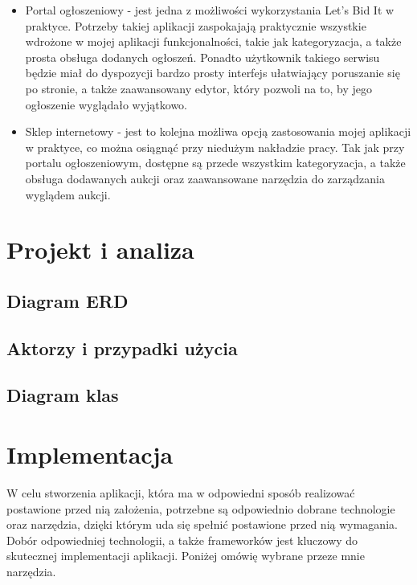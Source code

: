 \documentclass[brudnopis]{xmgr}
\begin{document}
\begin{itemize}

\item Portal ogłoszeniowy - jest jedna z możliwości wykorzystania Let's Bid It w praktyce. Potrzeby takiej aplikacji zaspokajają praktycznie wszystkie wdrożone w mojej aplikacji funkcjonalności, takie jak kategoryzacja, a także prosta obsługa dodanych ogłoszeń. Ponadto użytkownik takiego  serwisu będzie miał do dyspozycji bardzo prosty interfejs ułatwiający poruszanie się po stronie, a także zaawansowany edytor, który pozwoli na to, by jego ogłoszenie wyglądało wyjątkowo.

\item Sklep internetowy - jest to kolejna możliwa opcją zastosowania mojej aplikacji w praktyce, co można osiągnąć przy niedużym nakładzie pracy. Tak jak przy portalu ogłoszeniowym, dostępne są przede wszystkim kategoryzacja, a także obsługa dodawanych aukcji oraz zaawansowane narzędzia do zarządzania wyglądem aukcji.

\end{itemize}

\chapter{Projekt i analiza}

\section{Diagram ERD}

\section{Aktorzy i przypadki użycia}

\section{Diagram klas}

\chapter{Implementacja}
W celu stworzenia aplikacji, która ma w odpowiedni sposób realizować postawione przed nią
założenia, potrzebne są odpowiednio dobrane technologie oraz narzędzia, dzięki którym uda się 
spełnić postawione przed nią wymagania. Dobór odpowiedniej technologii, a także frameworków 
jest kluczowy do skutecznej implementacji aplikacji. Poniżej omówię wybrane przeze mnie narzędzia.
\end{document}
